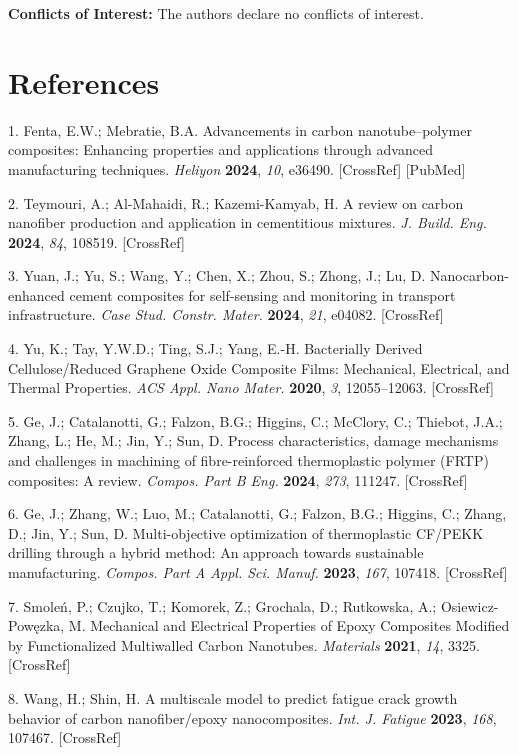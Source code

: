 \documentclass{article}
\begin{document}
\noindent\textbf{Conflicts of Interest:} The authors declare no conflicts of interest.

\section*{References}
\begin{hangpars}\small
1. Fenta, E.W.; Mebratie, B.A. Advancements in carbon nanotube–polymer composites: Enhancing properties and applications through advanced manufacturing techniques. \emph{Heliyon} \textbf{2024}, \emph{10}, e36490. [CrossRef] [PubMed]

2. Teymouri, A.; Al-Mahaidi, R.; Kazemi-Kamyab, H. A review on carbon nanofiber production and application in cementitious mixtures. \emph{J. Build. Eng.} \textbf{2024}, \emph{84}, 108519. [CrossRef]

3. Yuan, J.; Yu, S.; Wang, Y.; Chen, X.; Zhou, S.; Zhong, J.; Lu, D. Nanocarbon-enhanced cement composites for self-sensing and monitoring in transport infrastructure. \emph{Case Stud. Constr. Mater.} \textbf{2024}, \emph{21}, e04082. [CrossRef]

4. Yu, K.; Tay, Y.W.D.; Ting, S.J.; Yang, E.-H. Bacterially Derived Cellulose/Reduced Graphene Oxide Composite Films: Mechanical, Electrical, and Thermal Properties. \emph{ACS Appl. Nano Mater.} \textbf{2020}, \emph{3}, 12055–12063. [CrossRef]

5. Ge, J.; Catalanotti, G.; Falzon, B.G.; Higgins, C.; McClory, C.; Thiebot, J.A.; Zhang, L.; He, M.; Jin, Y.; Sun, D. Process characteristics, damage mechanisms and challenges in machining of fibre-reinforced thermoplastic polymer (FRTP) composites: A review. \emph{Compos. Part B Eng.} \textbf{2024}, \emph{273}, 111247. [CrossRef]

6. Ge, J.; Zhang, W.; Luo, M.; Catalanotti, G.; Falzon, B.G.; Higgins, C.; Zhang, D.; Jin, Y.; Sun, D. Multi-objective optimization of thermoplastic CF/PEKK drilling through a hybrid method: An approach towards sustainable manufacturing. \emph{Compos. Part A Appl. Sci. Manuf.} \textbf{2023}, \emph{167}, 107418. [CrossRef]

7. Smoleń, P.; Czujko, T.; Komorek, Z.; Grochala, D.; Rutkowska, A.; Osiewicz-Powęzka, M. Mechanical and Electrical Properties of Epoxy Composites Modified by Functionalized Multiwalled Carbon Nanotubes. \emph{Materials} \textbf{2021}, \emph{14}, 3325. [CrossRef]

8. Wang, H.; Shin, H. A multiscale model to predict fatigue crack growth behavior of carbon nanofiber/epoxy nanocomposites. \emph{Int. J. Fatigue} \textbf{2023}, \emph{168}, 107467. [CrossRef]


\end{hangpars}
\end{document}
